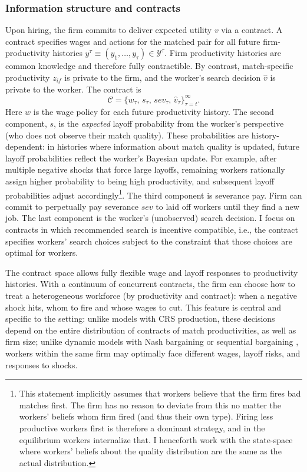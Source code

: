\subsubsection*{Information structure and contracts}
Upon hiring, the firm commits to deliver expected utility $v$ via a contract. A contract specifies wages and actions for the matched pair for all future firm-productivity histories $y^\tau \equiv (y_1,\ldots,y_\tau)\in \mathcal{Y}^{\tau}$. Firm productivity histories are common knowledge and therefore fully contractible. By contrast, match-specific productivity $z_{if}$ is private to the firm, and the worker’s search decision $\hat{v}$ is private to the worker. The contract is
\begin{equation}
\mathcal{C}=\{w_{\tau},\,s_{\tau},\,sev_{\tau},\,\hat{v}_{\tau}\}_{\tau=t}^{\infty}.
\end{equation}
Here $w$ is the wage policy for each future productivity history. The second component, $s$, is the \emph{expected} layoff probability from the worker’s perspective (who does not observe their match quality). These probabilities are history-dependent: in histories where information about match quality is updated, future layoff probabilities reflect the worker’s Bayesian update. For example, after multiple negative shocks that force large layoffs, remaining workers rationally assign higher probability to being high productivity, and subsequent layoff probabilities adjust accordingly\footnote{This statement implicitly assumes that workers believe that the firm fires bad matches first. The firm has no reason to deviate from this no matter the workers' beliefs whom firm fired (and thus their own type). Firing less productive workers first is therefore a dominant strategy, and in the equilibrium workers internalize that. I henceforth work with the state-space where workers' beliefs about the quality distribution are the same as the actual distribution.}. The third component is severance pay. Firm can commit to perpetually pay severance $sev$ to laid off workers until they find a new job. The last component is the worker’s (unobserved) search decision. I focus on contracts in which recommended search is incentive compatible, i.e., the contract specifies workers’ search choices subject to the constraint that those choices are optimal for workers.

The contract space allows fully flexible wage and layoff responses to productivity histories. With a continuum of concurrent contracts, the firm can choose how to treat a heterogeneous workforce (by productivity and contract): when a negative shock hits, whom to fire and whose wages to cut. This feature is central and specific to the setting: unlike models with CRS production, these decisions depend on the entire distribution of contracts of match productivities, as well as firm size; unlike dynamic models with Nash bargaining \parencite{mccrary2022} or sequential bargaining \parencite{bilal2022}, workers within the same firm may optimally face different wages, layoff risks, and responses to shocks.

